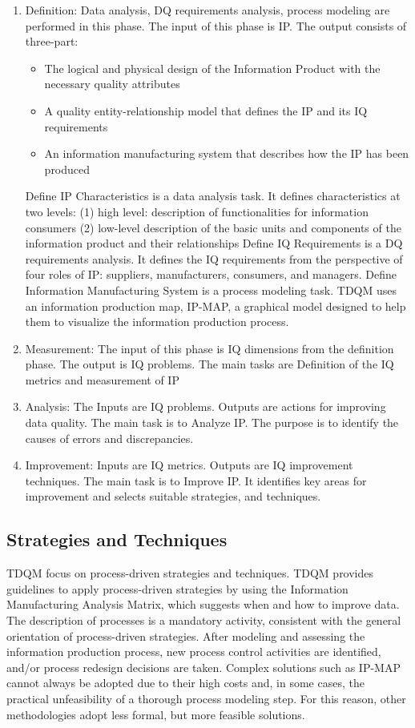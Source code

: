 \documentclass[pdftex,english,oribibl]{llncs}
\begin{document}
\begin{enumerate}
    \item Definition: Data analysis, DQ requirements analysis, process modeling are performed in this phase. The input of this phase is IP. The output consists of three-part:
    \begin{itemize}
        \item The logical and physical design of the Information Product with the necessary quality attributes
        \item A quality entity-relationship model that defines the IP and its IQ requirements
        \item An information manufacturing system that describes how the IP has been produced
    \end{itemize}
    Define IP Characteristics is a  data analysis task. It defines characteristics at two levels: (1) high level: description of functionalities for information consumers
(2) low-level description of the basic units and components of the information product and their relationships
Define IQ Requirements is a DQ requirements analysis. It defines the IQ requirements from the perspective of four roles of IP:  suppliers, manufacturers, consumers, and managers.
Define Information Manufacturing System is a process modeling task.
TDQM uses an information production map, IP-MAP, a graphical model designed to help them to visualize the information production process.
    \item  Measurement: The input of this phase is IQ dimensions from the definition phase. The output is IQ problems. The main tasks are Definition of the IQ metrics and measurement of IP
    \item Analysis: The Inputs are IQ problems. Outputs are actions for improving data quality. The main task is to Analyze IP. The purpose is to identify the causes of errors and discrepancies.
    \item Improvement: Inputs are  IQ metrics. Outputs are IQ improvement techniques. The main task is to Improve IP. It identifies key areas for improvement and selects suitable strategies, and techniques.
\end{enumerate}
\subsection{Strategies and Techniques}
TDQM focus on process-driven strategies and techniques. TDQM provides guidelines to apply process-driven strategies by using the Information Manufacturing Analysis Matrix\cite{Ballou1998ModelingInformation}, which suggests when and how to improve data. The description of processes is a mandatory activity, consistent with the general orientation of process-driven strategies. After modeling and assessing the information production process, new process control activities are identified, and/or process redesign decisions are taken.  Complex solutions such as IP-MAP cannot always be adopted due to their high costs and, in some cases, the practical unfeasibility of a thorough process modeling step. For this reason, other methodologies adopt less formal, but more feasible solutions.
\end{document}
